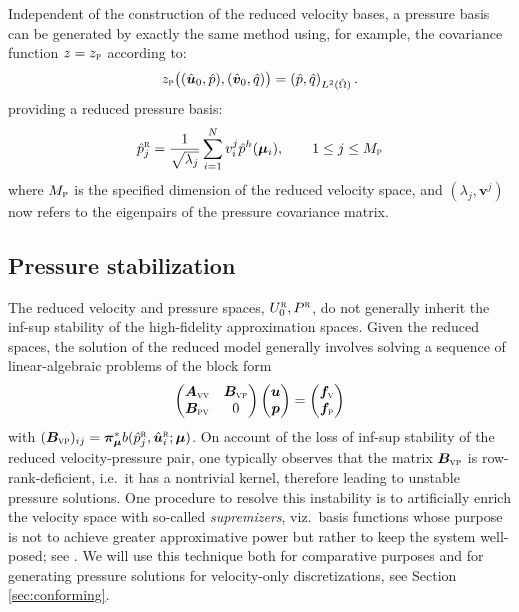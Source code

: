 \documentclass[onecolumn, twoside, a4paper, 11pt]{article}
\begin{document}
Independent of the construction of the reduced velocity bases, a pressure basis can
be generated by exactly the same method using, for example, the covariance function
$z=z_\textsc{p}$ according to:
%
\begin{equation}
z_\textsc{p}\big((\hat{\bm u}_0, \hat{p}), (\hat{\bm v}_0, \hat{q})\big) =
  \left( \hat{p}, \hat{q} \right)_{L^2(\hat{\Omega})}.
\end{equation}
%
providing a reduced pressure basis:
%
\begin{equation}
  \hat{p}^\textsc{r}_j = \frac{1}{\sqrt{\lambda_j}} \sum_{i=1}^N v^{j}_i \hat{p}^h(\bm{\mu}_i),
  \qquad 1 \leq j \leq M_\textsc{p}
\end{equation}
%
where $M_\textsc{p}$ is the specified dimension of the reduced velocity space, and $(\lambda_j,\bm{v}^j)$ now
refers to the eigenpairs of the pressure covariance matrix.


\subsection{Pressure stabilization}
\label{sec:stab}
The reduced velocity and pressure spaces, $U_0^{\textsc{r}},P^{\textsc{r}}$, do not generally inherit the
inf-sup stability of the high-fidelity approximation spaces. Given the reduced spaces, the solution of
the reduced model generally involves solving a sequence of linear-algebraic problems of the block form
%
\begin{equation}
  \label{eqn:sys-instab}
  \begin{pmatrix} \bm A_\textsc{vv} & \bm B_\textsc{vp} \\ \bm B_\textsc{pv} & 0\end{pmatrix}
  \begin{pmatrix} \bm u \\ \bm p \end{pmatrix}
  =
  \begin{pmatrix} \bm f_\textsc{v} \\ \bm f_\textsc{p} \end{pmatrix}
\end{equation}
%
with $(\bm B_\textsc{vp})_{ij}=\bm{\pi}^*_{\bm{\mu}}b(\hat{p}_j^\textsc{r},\hat{\bm{u}}_i^\textsc{r};\bm{\mu})$.
On account of the loss of inf-sup stability of the reduced velocity-pressure pair,
one typically observes that the matrix $\bm B_\textsc{vp}$ is row-rank-deficient, i.e.~it
has a nontrivial kernel, therefore leading to unstable pressure solutions. One procedure to resolve this
instability is to artificially enrich the velocity space with so-called
\emph{supremizers}, viz.~basis functions whose purpose is not to achieve greater approximative power but
rather to keep the system well-posed; see \cite{Ballarin2015ssp}. We will use this technique
both for comparative purposes and for generating pressure solutions for velocity-only
discretizations, see Section \ref{sec:conforming}.
\end{document}

